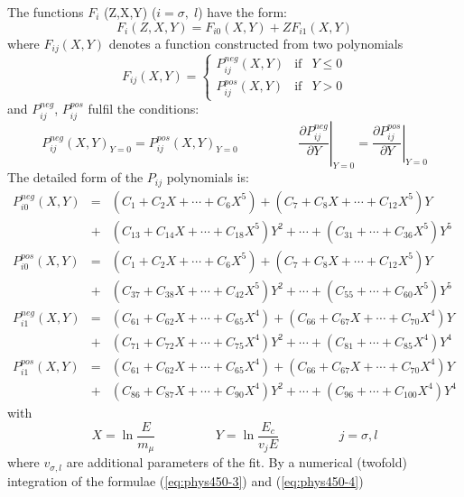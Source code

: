 The functions $ F_i $ (Z,X,Y) ($ i=\sigma,\;l $) have the form:
\begin{equation}
 F_i(Z,X,Y) = F_{i0}(X,Y)+ZF_{i1}(X,Y)
\end{equation}
where $F_{ij}(X,Y)$ denotes a function constructed from two polynomials
\begin{equation}
 F_{ij}(X,Y) = \left\{ \begin{array}{LlL}
                   P_{ij}^{neg}(X,Y)  & \mbox{if} & Y \leq 0 \\ [0.3cm]
                   P_{ij}^{pos}(X,Y)  & \mbox{if} & Y > 0
                   \end{array} \right.
\end{equation}
and $P_{ij}^{neg}$, $P_{ij}^{pos}$ fulfil the conditions:
\[
P_{ij}^{neg}(X,Y)_{Y=0} = P_{ij}^{pos}(X,Y)_{Y=0} 
\hspace{2cm}
\left . \frac{\partial P_{ij}^{neg}}{\partial Y } \right |_{Y=0}  =
\left . \frac{\partial P_{ij}^{pos}}{\partial Y } \right |_{Y=0}
\]
The detailed form of the $P_{ij}$ polynomials is:
\begin{eqnarray}
P_{i0}^{neg}(X,Y)& = &
        (C_1+C_2X+\cdots+C_6X^5)+(C_7+C_8X+\cdots+C_{12}X^5)Y
\nonumber \\
  & + &(C_{13}+C_{14}X+\cdots+C_{18}X^5)Y^2+\cdots+(C_{31}+\cdots+C_{36}X^5)Y^5
\nonumber\\
P_{i0}^{pos}(X,Y)& = &
        (C_1+C_2X+\cdots+C_6X^5)+(C_7+C_8X+\cdots+C_{12}X^5)Y
\nonumber\\
\label{eq:phys450-5}
  & + &(C_{37}+C_{38}X+\cdots+C_{42}X^5)Y^2+\cdots+(C_{55}+\cdots+C_{60}X^5)Y^5
         \\
P_{i1}^{neg}(X,Y)& = &
  (C_{61}+C_{62}X+\cdots+C_{65}X^4)+(C_{66}+C_{67}X+\cdots+C_{70}X^4)Y
\nonumber \\
  & + &(C_{71}+C_{72}X+\cdots+C_{75}X^4)Y^2+\cdots+(C_{81}+\cdots+C_{85}X^4)Y^4
\nonumber \\
 P_{i1}^{pos}(X,Y)& = &
  (C_{61}+C_{62}X+\cdots+C_{65}X^4)+(C_{66}+C_{67}X+\cdots+C_{70}X^4)Y
\nonumber \\
  & + &(C_{86}+C_{87}X+\cdots+C_{90}X^4)Y^2+\cdots+(C_{96}+\cdots+C_{100}X^4)Y^4
\nonumber
\end{eqnarray}
with
\[
X = \ln \frac{E}{m_{\mu}} \hspace{2cm} Y = \ln \frac{E_{c}}{v_{j} E}
\hspace{2cm} j = \sigma, l
\]
where $v_{\sigma,l}$ are additional parameters of the fit.
By a numerical (twofold) integration of the formulae (\ref{eq:phys450-3})
and (\ref{eq:phys450-4})
